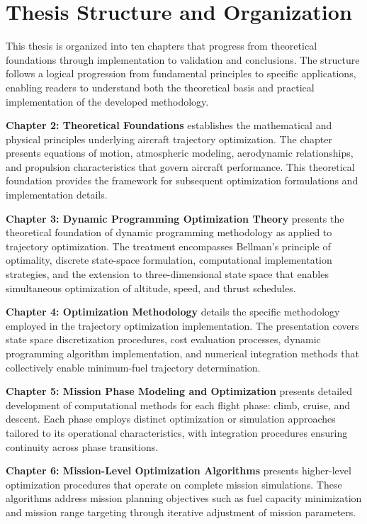 \section{Thesis Structure and Organization}

This thesis is organized into ten chapters that progress from theoretical foundations through implementation to validation and conclusions. The structure follows a logical progression from fundamental principles to specific applications, enabling readers to understand both the theoretical basis and practical implementation of the developed methodology.

\textbf{Chapter 2: Theoretical Foundations} establishes the mathematical and physical principles underlying aircraft trajectory optimization. The chapter presents equations of motion, atmospheric modeling, aerodynamic relationships, and propulsion characteristics that govern aircraft performance. This theoretical foundation provides the framework for subsequent optimization formulations and implementation details.

\textbf{Chapter 3: Dynamic Programming Optimization Theory} presents the theoretical foundation of dynamic programming methodology as applied to trajectory optimization. The treatment encompasses Bellman's principle of optimality, discrete state-space formulation, computational implementation strategies, and the extension to three-dimensional state space that enables simultaneous optimization of altitude, speed, and thrust schedules.

\textbf{Chapter 4: Optimization Methodology} details the specific methodology employed in the trajectory optimization implementation. The presentation covers state space discretization procedures, cost evaluation processes, dynamic programming algorithm implementation, and numerical integration methods that collectively enable minimum-fuel trajectory determination.

\textbf{Chapter 5: Mission Phase Modeling and Optimization} presents detailed development of computational methods for each flight phase: climb, cruise, and descent. Each phase employs distinct optimization or simulation approaches tailored to its operational characteristics, with integration procedures ensuring continuity across phase transitions.

\textbf{Chapter 6: Mission-Level Optimization Algorithms} presents higher-level optimization procedures that operate on complete mission simulations. These algorithms address mission planning objectives such as fuel capacity minimization and mission range targeting through iterative adjustment of mission parameters.

